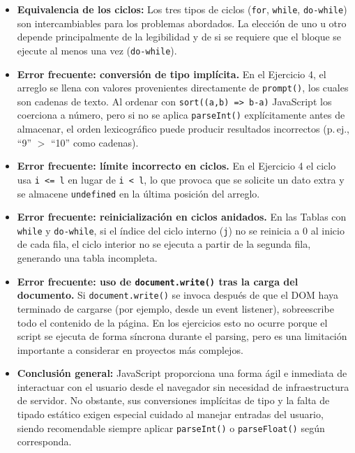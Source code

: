 \documentclass[10pt,a4paper]{article}
\begin{document}
\begin{itemize}

    \item \textbf{Equivalencia de los ciclos:} Los tres tipos de ciclos (\texttt{for}, \texttt{while}, \texttt{do-while}) son intercambiables para los problemas abordados. La elección de uno u otro depende principalmente de la legibilidad y de si se requiere que el bloque se ejecute al menos una vez (\texttt{do-while}).

    \item \textbf{Error frecuente: conversión de tipo implícita.} En el Ejercicio 4, el arreglo se llena con valores provenientes directamente de \texttt{prompt()}, los cuales son cadenas de texto. Al ordenar con \texttt{sort((a,b) => b-a)} JavaScript los coerciona a número, pero si no se aplica \texttt{parseInt()} explícitamente antes de almacenar, el orden lexicográfico puede producir resultados incorrectos (p.\,ej., ``9'' $>$ ``10'' como cadenas).

    \item \textbf{Error frecuente: límite incorrecto en ciclos.} En el Ejercicio 4 el ciclo usa \texttt{i <= l} en lugar de \texttt{i < l}, lo que provoca que se solicite un dato extra y se almacene \texttt{undefined} en la última posición del arreglo.

    \item \textbf{Error frecuente: reinicialización en ciclos anidados.} En las Tablas con \texttt{while} y \texttt{do-while}, si el índice del ciclo interno (\texttt{j}) no se reinicia a 0 al inicio de cada fila, el ciclo interior no se ejecuta a partir de la segunda fila, generando una tabla incompleta.

    \item \textbf{Error frecuente: uso de \texttt{document.write()} tras la carga del documento.} Si \texttt{document.write()} se invoca después de que el DOM haya terminado de cargarse (por ejemplo, desde un event listener), sobreescribe todo el contenido de la página. En los ejercicios esto no ocurre porque el script se ejecuta de forma síncrona durante el parsing, pero es una limitación importante a considerar en proyectos más complejos.

    \item \textbf{Conclusión general:} JavaScript proporciona una forma ágil e inmediata de interactuar con el usuario desde el navegador sin necesidad de infraestructura de servidor. No obstante, sus conversiones implícitas de tipo y la falta de tipado estático exigen especial cuidado al manejar entradas del usuario, siendo recomendable siempre aplicar \texttt{parseInt()} o \texttt{parseFloat()} según corresponda.

\end{itemize}
\end{document}
